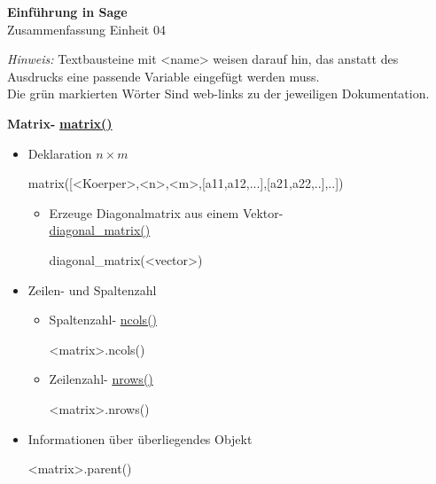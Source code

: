 \documentclass[a4paper,9pt,DIV15,twocolumn]{scrartcl}
\begin{document}
\begin{center}
    \textbf{\LARGE Einführung in Sage}\\
    {\large Zusammenfassung Einheit 04}
\end{center}
\textsl{Hinweis:} Textbausteine mit <name> weisen darauf hin, das anstatt des Ausdrucks eine passende Variable eingefügt werden muss.\\
Die {\color{Green}grün} markierten Wörter Sind web-links zu der jeweiligen Dokumentation.

\medskip
\textbf{Matrix- } \href{https://sage.math.uni-goettingen.de/doc/static/reference/sage/matrix/constructor.html#sage.matrix.constructor.Matrix}{\textbf{matrix()}}
\begin{itemize}
\item Deklaration $n\times m$
\begin{sagein}
matrix([<Koerper>,<n>,<m>,[a11,a12,...],[a21,a22,..],..])
\end{sagein}
\begin{itemize}
\item Erzeuge Diagonalmatrix aus einem Vektor-\\ \href{https://sage.math.uni-goettingen.de/doc/static/reference/sage/matrix/constructor.html#sage.matrix.constructor.diagonal_matrix}{diagonal\_matrix()}
\begin{sagein}
diagonal_matrix(<vector>)
\end{sagein}
\end{itemize}
\item Zeilen- und Spaltenzahl
\begin{itemize}
 \item Spaltenzahl- \href{https://sage.math.uni-goettingen.de/doc/static/reference/sage/matrix/matrix0.html?highlight=matrix.rank#sage.matrix.matrix0.Matrix.ncols}{ncols()}
\begin{sagein}
<matrix>.ncols()
\end{sagein}
\item Zeilenzahl- \href{https://sage.math.uni-goettingen.de/doc/static/reference/sage/matrix/matrix0.html?highlight=matrix.rank#sage.matrix.matrix0.Matrix.nrows}{nrows()}
\begin{sagein}
<matrix>.nrows()
\end{sagein}
\end{itemize}
\item Informationen über überliegendes Objekt
\begin{sagein}
<matrix>.parent()
\end{sagein}

\end{itemize}
\end{document}
